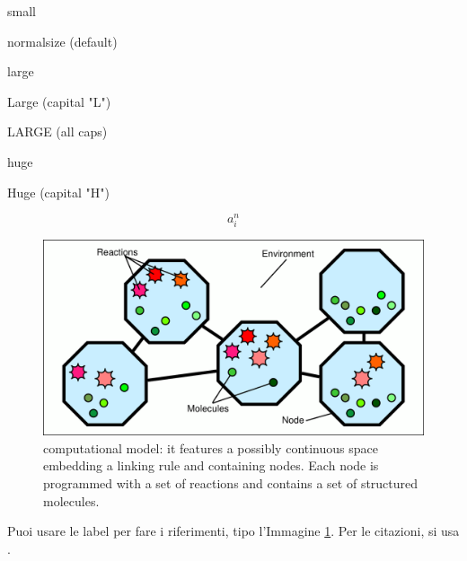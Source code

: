 \documentclass[a4paper,12pt]{report}
\begin{document}
\small
small

\normalsize
normalsize (default)

\large
large

\Large
Large (capital "L")

\LARGE
LARGE (all caps)

\huge
huge

\Huge
Huge (capital "H")

\normalsize
\begin{equation}
a_i^n
\end{equation}

\begin{figure}
  \begin{center}
    \includegraphics[width=0.99\columnwidth]{images/model.pdf}
    \caption{computational model: it features a possibly continuous space embedding a linking rule and containing nodes. Each node is programmed with a set of reactions and contains a set of structured molecules.}
    \label{img:model}
  \end{center}
\end{figure}

Puoi usare le label per fare i riferimenti, tipo l'Immagine \ref{img:model}. Per le citazioni, si usa \cite{papero}.





\end{document}
